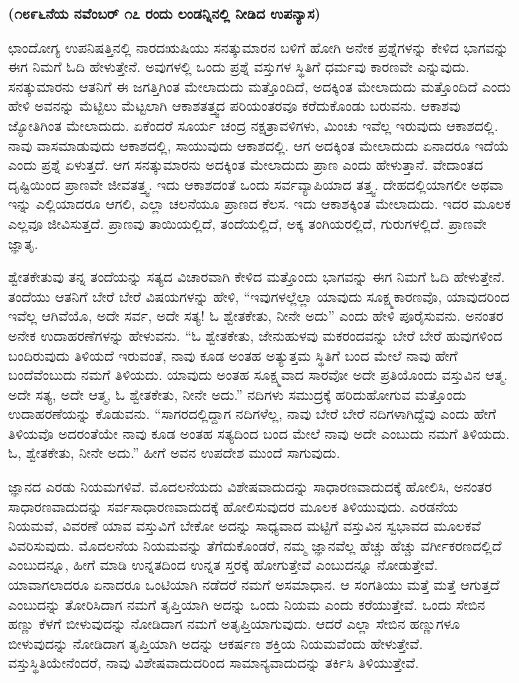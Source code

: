 \centerline{\textbf{(೧೮೯೬ನೆಯ ನವೆಂಬರ್​ ೧೭ ರಂದು ಲಂಡನ್ನಿನಲ್ಲಿ ನೀಡಿದ ಉಪನ್ಯಾಸ)}}

ಛಾಂದೋಗ್ಯ ಉಪನಿಷತ್ತಿನಲ್ಲಿ ನಾರದಋಷಿಯು ಸನತ್ಕುಮಾರನ ಬಳಿಗೆ ಹೋಗಿ ಅನೇಕ ಪ್ರಶ್ನೆಗಳನ್ನು ಕೇಳಿದ ಭಾಗವನ್ನು ಈಗ ನಿಮಗೆ ಓದಿ ಹೇಳುತ್ತೇನೆ. ಅವುಗಳಲ್ಲಿ ಒಂದು ಪ್ರಶ್ನೆ ವಸ್ತುಗಳ ಸ್ಥಿತಿಗೆ ಧರ್ಮವು ಕಾರಣವೇ ಎನ್ನುವುದು. ಸನತ್ಕುಮಾರನು ಆತನಿಗೆ ಈ ಜಗತ್ತಿಗಿಂತ ಮೇಲಾದುದು ಮತ್ತೊಂದಿದೆ, ಅದಕ್ಕಿಂತ ಮೇಲಾದುದು ಮತ್ತೊಂದಿದೆ ಎಂದು ಹೇಳಿ ಅವನನ್ನು ಮೆಟ್ಟಿಲು ಮೆಟ್ಟಲಾಗಿ ಆಕಾಶತತ್ತ್ವದ ಪರಿಯಂತರವೂ ಕರೆದುಕೊಂಡು ಬರುವನು. ಆಕಾಶವು ಜ್ಯೋತಿಗಿಂತ ಮೇಲಾದುದು. ಏಕೆಂದರೆ ಸೂರ್ಯ ಚಂದ್ರ ನಕ್ಷತ್ರಾವಳಿಗಳು, ಮಿಂಚು ಇವೆಲ್ಲ ಇರುವುದು ಆಕಾಶದಲ್ಲಿ. ನಾವು ವಾಸಮಾಡುವುದು ಆಕಾಶದಲ್ಲಿ, ಸಾಯುವುದು ಆಕಾಶದಲ್ಲಿ. ಆಗ ಅದಕ್ಕಿಂತ ಮೇಲಾದುದು ಏನಾದರೂ ಇದೆಯೆ ಎಂದು ಪ್ರಶ್ನೆ ಏಳುತ್ತದೆ. ಆಗ ಸನತ್ಕುಮಾರನು ಅದಕ್ಕಿಂತ ಮೇಲಾದುದು ಪ್ರಾಣ ಎಂದು ಹೇಳುತ್ತಾನೆ. ವೇದಾಂತದ ದೃಷ್ಟಿಯಿಂದ ಪ್ರಾಣವೇ ಜೀವತತ್ತ್ವ. ಇದು ಆಕಾಶದಂತೆ ಒಂದು ಸರ್ವವ್ಯಾಪಿಯಾದ ತತ್ತ್ವ. ದೇಹದಲ್ಲಿಯಾಗಲೀ ಅಥವಾ ಇನ್ನು ಎಲ್ಲಿಯಾದರೂ ಆಗಲಿ, ಎಲ್ಲಾ ಚಲನೆಯೂ ಪ್ರಾಣದ ಕೆಲಸ. ಇದು ಆಕಾಶಕ್ಕಿಂತ ಮೇಲಾದುದು. ಇದರ ಮೂಲಕ ಎಲ್ಲವೂ ಜೀವಿಸುತ್ತದೆ. ಪ್ರಾಣವು ತಾಯಿಯಲ್ಲಿದೆ, ತಂದೆಯಲ್ಲಿದೆ, ಅಕ್ಕ ತಂಗಿಯರಲ್ಲಿದೆ, ಗುರುಗಳಲ್ಲಿದೆ. ಪ್ರಾಣವೇ ಜ್ಞಾತೃ. 

\vskip 5pt

ಶ್ವೇತಕೇತುವು ತನ್ನ ತಂದೆಯನ್ನು ಸತ್ಯದ ವಿಚಾರವಾಗಿ ಕೇಳಿದ ಮತ್ತೊಂದು ಭಾಗವನ್ನು ಈಗ ನಿಮಗೆ ಓದಿ ಹೇಳುತ್ತೇನೆ. ತಂದೆಯು ಆತನಿಗೆ ಬೇರೆ ಬೇರೆ ವಿಷಯಗಳನ್ನು ಹೇಳಿ, “ಇವುಗಳಲ್ಲೆಲ್ಲಾ ಯಾವುದು ಸೂಕ್ಷ್ಮಕಾರಣವೊ, ಯಾವುದರಿಂದ ಇವೆಲ್ಲ ಆಗಿವೆಯೊ, ಅದೇ ಸರ್ವ, ಅದೇ ಸತ್ಯ! ಓ ಶ್ವೇತಕೇತು, ನೀನೇ ಅದು” ಎಂದು ಹೇಳಿ ಪೂರೈಸುವನು. ಅನಂತರ ಅನೇಕ ಉದಾಹರಣೆಗಳನ್ನು ಹೇಳುವನು. “ಓ ಶ್ವೇತಕೇತು, ಜೇನುಹುಳವು ಮಕರಂದವನ್ನು ಬೇರೆ ಬೇರೆ ಹುವುಗಳಿಂದ ಬಂದಿರುವುದು ತಿಳಿಯದೆ ಇರುವಂತೆ, ನಾವು ಕೂಡ ಅಂತಹ ಅತ್ಯುತ್ತಮ ಸ್ಥಿತಿಗೆ ಬಂದ ಮೇಲೆ ನಾವು ಹೇಗೆ ಬಂದೆವೆಂಬುದು ನಮಗೆ ತಿಳಿಯದು. ಯಾವುದು ಅಂತಹ ಸೂಕ್ಷ್ಮವಾದ ಸಾರವೋ ಅದೇ ಪ್ರತಿಯೊಂದು ವಸ್ತುವಿನ ಆತ್ಮ. ಅದೇ ಸತ್ಯ, ಅದೇ ಆತ್ಮ, ಓ ಶ್ವೇತಕೇತು, ನೀನೇ ಅದು.” ನದಿಗಳು ಸಮುದ್ರಕ್ಕೆ ಹರಿದುಹೋಗುವ ಮತ್ತೊಂದು ಉದಾಹರಣೆಯನ್ನು ಕೊಡುವನು. “ಸಾಗರದಲ್ಲಿದ್ದಾಗ ನದಿಗಳೆಲ್ಲ, ನಾವು ಬೇರೆ ಬೇರೆ ನದಿಗಳಾಗಿದ್ದೆವು ಎಂದು ಹೇಗೆ ತಿಳಿಯವೊ ಅದರಂತೆಯೇ ನಾವು ಕೂಡ ಅಂತಹ ಸತ್ಯದಿಂದ ಬಂದ ಮೇಲೆ ನಾವು ಅದೇ ಎಂಬುದು ನಮಗೆ ತಿಳಿಯದು. ಓ, ಶ್ವೇತಕೇತು, ನೀನೇ ಅದು.” ಹೀಗೆ ಅವನ ಉಪದೇಶ ಮುಂದೆ ಸಾಗುವುದು. 

ಜ್ಞಾನದ ಎರಡು ನಿಯಮಗಳಿವೆ. ಮೊದಲನೆಯದು ವಿಶೇಷವಾದುದನ್ನು ಸಾಧಾರಣವಾದುದಕ್ಕೆ ಹೋಲಿಸಿ, ಅನಂತರ ಸಾಧಾರಣವಾದುದನ್ನು ಸರ್ವಸಾಧಾರಣವಾದುದಕ್ಕೆ ಹೋಲಿಸುವುದರ ಮೂಲಕ ತಿಳಿಯುವುದು. ಎರಡನೆಯ ನಿಯಮವೆ, ವಿವರಣೆ ಯಾವ ವಸ್ತುವಿಗೆ ಬೇಕೋ ಅದನ್ನು ಸಾಧ್ಯವಾದ ಮಟ್ಟಿಗೆ ವಸ್ತುವಿನ ಸ್ವಭಾವದ ಮೂಲಕವೆ ವಿವರಿಸುವುದು. ಮೊದಲನೆಯ ನಿಯಮವನ್ನು ತೆಗೆದುಕೊಂಡರೆ, ನಮ್ಮ ಜ್ಞಾನವೆಲ್ಲ ಹೆಚ್ಚು ಹೆಚ್ಚು ವರ್ಗೀಕರಣದಲ್ಲಿದೆ ಎಂಬುದನ್ನೂ, ಹೀಗೆ ಮಾಡಿ ಉನ್ನತದಿಂದ ಉನ್ನತ ಸ್ತರಕ್ಕೆ ಹೋಗುತ್ತೇವೆ ಎಂಬುದನ್ನೂ ನೋಡುತ್ತೇವೆ. ಯಾವಾಗಲಾದರೂ ಏನಾದರೂ ಒಂಟಿಯಾಗಿ ನಡೆದರೆ ನಮಗೆ ಅಸಮಾಧಾನ. ಆ ಸಂಗತಿಯು ಮತ್ತೆ ಮತ್ತೆ ಆಗುತ್ತದೆ ಎಂಬುದನ್ನು ತೋರಿಸಿದಾಗ ನಮಗೆ ತೃಪ್ತಿಯಾಗಿ ಅದನ್ನು ಒಂದು ನಿಯಮ ಎಂದು ಕರೆಯುತ್ತೇವೆ. ಒಂದು ಸೇಬಿನ ಹಣ್ಣು ಕೆಳಗೆ ಬೀಳುವುದನ್ನು ನೋಡಿದಾಗ ನಮಗೆ ಅತೃಪ್ತಿಯಾಗುವುದು. ಆದರೆ ಎಲ್ಲಾ ಸೇಬಿನ ಹಣ್ಣುಗಳೂ ಬೀಳುವುದನ್ನು ನೋಡಿದಾಗ ತೃಪ್ತಿಯಾಗಿ ಅದನ್ನು ಆಕರ್ಷಣ ಶಕ್ತಿಯ ನಿಯಮವೆಂದು ಹೇಳುತ್ತೇವೆ. ವಸ್ತುಸ್ಥಿತಿಯೇನೆಂದರೆ, ನಾವು ವಿಶೇಷವಾದುದರಿಂದ ಸಾಮಾನ್ಯವಾದುದನ್ನು ತರ್ಕಿಸಿ ತಿಳಿಯುತ್ತೇವೆ. 

